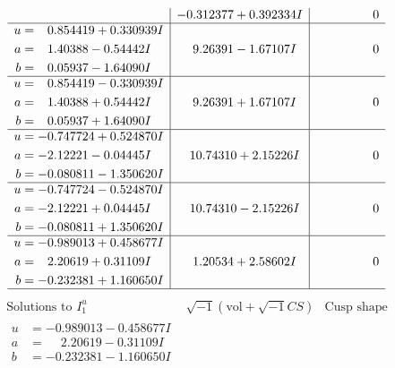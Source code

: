 \documentclass[1p]{elsarticle_modified}
\theoremstyle{definition}
\newcommand{\I}{\sqrt{-1}}
\begin{document}
$$\begin{array}{c|c|c}
 & -0.312377 + 0.392334 I & \phantom{-0.000000 } 0 \\ \hline\begin{aligned}
u &= \phantom{-}0.854419 + 0.330939 I \\
a &= \phantom{-}1.40388 - 0.54442 I \\
b &= \phantom{-}0.05937 - 1.64090 I\end{aligned}
 & \phantom{-}9.26391 - 1.67107 I & \phantom{-0.000000 } 0 \\ \hline\begin{aligned}
u &= \phantom{-}0.854419 - 0.330939 I \\
a &= \phantom{-}1.40388 + 0.54442 I \\
b &= \phantom{-}0.05937 + 1.64090 I\end{aligned}
 & \phantom{-}9.26391 + 1.67107 I & \phantom{-0.000000 } 0 \\ \hline\begin{aligned}
u &= -0.747724 + 0.524870 I \\
a &= -2.12221 - 0.04445 I \\
b &= -0.080811 - 1.350620 I\end{aligned}
 & \phantom{-}10.74310 + 2.15226 I & \phantom{-0.000000 } 0 \\ \hline\begin{aligned}
u &= -0.747724 - 0.524870 I \\
a &= -2.12221 + 0.04445 I \\
b &= -0.080811 + 1.350620 I\end{aligned}
 & \phantom{-}10.74310 - 2.15226 I & \phantom{-0.000000 } 0 \\ \hline\begin{aligned}
u &= -0.989013 + 0.458677 I \\
a &= \phantom{-}2.20619 + 0.31109 I \\
b &= -0.232381 + 1.160650 I\end{aligned}
 & \phantom{-}1.20534 + 2.58602 I & \phantom{-0.000000 } 0\\
 \hline 
 \end{array}$$\newpage$$\begin{array}{c|c|c}  
\text{Solutions to }I^u_{1}& \I (\text{vol} + \sqrt{-1}CS) & \text{Cusp shape}\\
 \hline 
\begin{aligned}
u &= -0.989013 - 0.458677 I \\
a &= \phantom{-}2.20619 - 0.31109 I \\
b &= -0.232381 - 1.160650 I\end{aligned}

\end{array}$$
\end{document}
